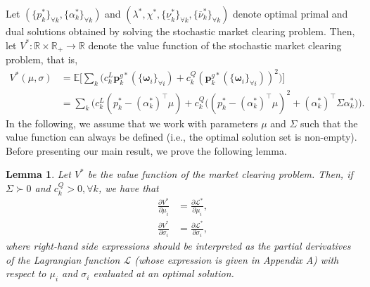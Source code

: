 \documentclass{article}
\newtheorem{lemma}{Lemma}
\begin{document}
Let $(\{p_k^*\}_{\forall k}, \{\alpha_k^*\}_{\forall k})$ and $(\lambda^*, \chi^*, \{\underline{\nu}_k^*\}_{\forall k}, \{\overline{\nu}_k^*\}_{\forall k})$ denote optimal primal and dual solutions obtained by solving the stochastic market clearing problem. Then, let $V^*: \mathbb{R} \times \mathbb{R}_+ \rightarrow \mathbb{R}$ denote the value function of the stochastic market clearing problem, that is, 
\begin{align*}
V^*(\mu, \sigma) &= \mathbb{E}\Big[\sum_k \big(c_k^L \mathbf{p}_k^{g*}(\{\boldsymbol{\omega}_i\}_{\forall i}) + c_k^Q (\mathbf{p}_k^{g*}(\{\boldsymbol{\omega}_i\}_{\forall i}))^2\big)\Big]\\
 &= \sum_k \Big(c_k^L(p_k^* - (\alpha_k^*)^\top \mu) + c_k^Q \big((p_k^* - (\alpha_k^*)^\top \mu)^2 + (\alpha_k^*)^\top \Sigma \alpha_k^* \big)\Big).
\end{align*}
In the following, we assume that we work with parameters $\mu$ and $\Sigma$ such that the value function can always be defined (i.e., the optimal solution set is non-empty). Before presenting our main result, we prove the following lemma.
\begin{lemma}\label{lemma1}
Let $V^*$ be the value function of the market clearing problem. Then, if $\Sigma \succ 0$ and $c_k^Q > 0, \forall k$, we have that
\begin{align*}
\frac{\partial V^*}{\partial \mu_i} &= \frac{\partial \mathcal{L}^*}{\partial \mu_i},\\
\frac{\partial V^*}{\partial \sigma_i} &= \frac{\partial \mathcal{L}^*}{\partial \sigma_i},
\end{align*}
where right-hand side expressions should be interpreted as the partial derivatives of the Lagrangian function $\mathcal{L}$ (whose expression is given in Appendix A) with respect to $\mu_i$ and $\sigma_i$ evaluated at an optimal solution.
\end{lemma}
\end{document}
